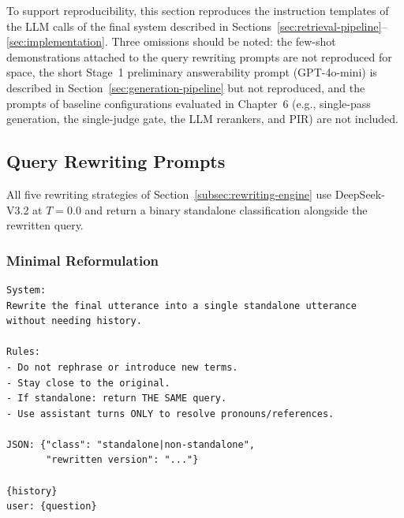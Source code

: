 To support reproducibility, this section reproduces the instruction templates of the LLM calls of the final system described in Sections~\ref{sec:retrieval-pipeline}--\ref{sec:implementation}. Three omissions should be noted: the few-shot demonstrations attached to the query rewriting prompts are not reproduced for space, the short Stage~1 preliminary answerability prompt (GPT-4o-mini) is described in Section~\ref{sec:generation-pipeline} but not reproduced, and the prompts of baseline configurations evaluated in Chapter~6 (e.g., single-pass generation, the single-judge gate, the LLM rerankers, and PIR) are not included.

\subsection{Query Rewriting Prompts}
\label{subsec:prompt-rewriting}

All five rewriting strategies of Section~\ref{subsec:rewriting-engine} use DeepSeek-V3.2 at $T{=}0.0$ and return a binary standalone classification alongside the rewritten query.

\subsubsection{Minimal Reformulation}
\begin{verbatim}
System:
Rewrite the final utterance into a single standalone utterance 
without needing history.

Rules:
- Do not rephrase or introduce new terms.
- Stay close to the original.
- If standalone: return THE SAME query.
- Use assistant turns ONLY to resolve pronouns/references.

JSON: {"class": "standalone|non-standalone",
       "rewritten version": "..."}

{history}
user: {question}
\end{verbatim}

